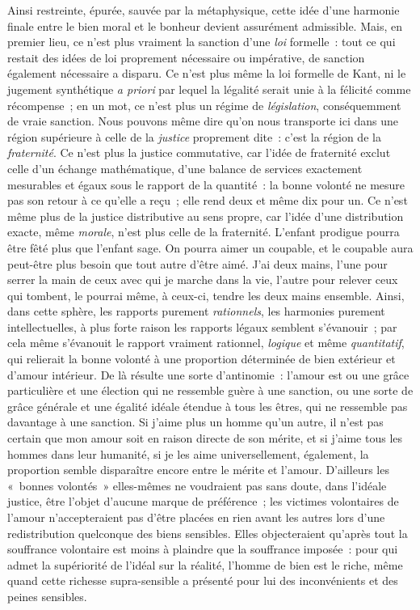 \documentclass[french,twoside]{book} %
\begin{document}
Ainsi restreinte, épurée, sauvée par la métaphysique, cette idée d’une harmonie finale entre le bien moral et le bonheur devient assurément admissible. Mais, en premier lieu, ce n’est plus vraiment la sanction d’une \emph{loi} formelle : tout ce qui restait des idées de loi proprement nécessaire ou impérative, de sanction également nécessaire a disparu. Ce n’est plus même la loi formelle de Kant, ni le jugement synthétique \emph{a priori} par lequel la légalité serait unie à la félicité comme récompense ; en un mot, ce n’est plus un régime de \emph{législation}, conséquemment de vraie sanction. Nous pouvons même dire qu’on nous transporte ici dans une région supérieure à celle de la \emph{justice} proprement dite : c’est la région de la \emph{fraternité}. Ce n’est plus la justice commutative, car l’idée de fraternité exclut celle d’un échange mathématique, d’une balance de services exactement mesurables et égaux sous le rapport de la quantité : la bonne volonté ne mesure pas son retour à ce qu’elle a reçu ; elle rend deux et même dix pour un. Ce n’est même plus de la justice distributive au sens propre, car l’idée d’une distribution exacte, même \emph{morale}, n’est plus celle de la fraternité. L’enfant prodigue pourra être fêté plus que l’enfant sage. On pourra aimer un coupable, et le coupable aura peut-être plus besoin que tout autre d’être aimé. J’ai deux mains, l’une pour serrer la main de ceux avec qui je marche dans la vie, l’autre pour relever ceux qui tombent, le pourrai même, à ceux-ci, tendre les deux mains ensemble. Ainsi, dans cette sphère, les rapports purement \emph{rationnels}, les harmonies purement intellectuelles, à plus forte raison les rapports légaux semblent s’évanouir ; par cela même s’évanouit le rapport vraiment rationnel, \emph{logique} et même \emph{quantitatif}, qui relierait la bonne volonté à une proportion déterminée de bien extérieur et d’amour intérieur. De là résulte une sorte d’antinomie : l’amour est ou une grâce particulière et une élection qui ne ressemble guère à une sanction, ou une sorte de grâce générale et une égalité idéale étendue à tous les êtres, qui ne ressemble pas davantage à une sanction. Si j’aime plus un homme qu’un autre, il n’est pas certain que mon amour soit en raison directe de son mérite, et si j’aime tous les hommes dans leur humanité, si je les aime universellement, également, la proportion semble disparaître encore entre le mérite et l’amour. D’ailleurs les « bonnes volontés » elles-mêmes ne voudraient pas sans doute, dans l’idéale justice, être l’objet d’aucune marque de préférence ; les victimes volontaires de l’amour n’accepteraient pas d’être placées en rien avant les autres lors d’une redistribution quelconque des biens sensibles. Elles objecteraient qu’après tout la souffrance volontaire est moins à plaindre que la souffrance imposée : pour qui admet la supériorité de l’idéal sur la réalité, l’homme de bien est le riche, même quand cette richesse supra-sensible a présenté pour lui des inconvénients et des peines sensibles.\par
\end{document}
